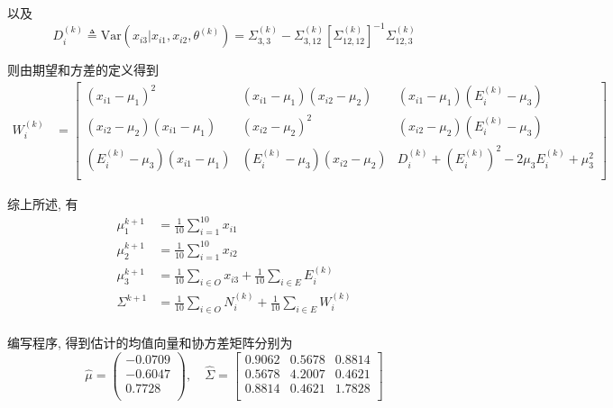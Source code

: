 \documentclass{article}
\begin{document}
以及
\begin{equation}
  D_i^{(k)}\triangleq\mathrm{Var}(x_{i3}|x_{i1},x_{i2},\theta^{(k)})=\Sigma_{3,3}^{(k)}-\Sigma_{3,12}^{(k)}\left[\Sigma_{12,12}^{(k)}\right]^{-1}\Sigma_{12,3}^{(k)}
\end{equation}

则由期望和方差的定义得到
\begin{equation}
  \begin{aligned}
    W_i^{(k)}
    &=
    \begin{bmatrix}
      (x_{i1}-\mu_1)^2 & (x_{i1}-\mu_1)(x_{i2}-\mu_2) & (x_{i1}-\mu_1)\left(E_i^{(k)}-\mu_3\right)\\[2mm]
      (x_{i2}-\mu_2)(x_{i1}-\mu_1) & (x_{i2}-\mu_2)^2 & (x_{i2}-\mu_2)\left(E_i^{(k)}-\mu_3\right)\\
      \left(E_i^{(k)}-\mu_3\right)(x_{i1}-\mu_1) & \left(E_i^{(k)}-\mu_3\right)(x_{i2}-\mu_2) & D_i^{(k)}+\left(E_i^{(k)}\right)^2-2\mu_3E_i^{(k)}+\mu_3^2\\
    \end{bmatrix}
  \end{aligned}
\end{equation}

综上所述, 有
\begin{equation}
  \begin{aligned}
    \mu_1^{k+1}&=\frac{1}{10}\sum_{i=1}^{10}x_{i1}\\
    \mu_2^{k+1}&=\frac{1}{10}\sum_{i=1}^{10}x_{i2}\\
    \mu_3^{k+1}&=\frac{1}{10}\sum_{i\in O}x_{i3}+\frac{1}{10}\sum_{i\in E}E_i^{(k)}\\
    \Sigma^{k+1}&=\frac{1}{10}\sum_{i\in O}N_i^{(k)}+\frac{1}{10}\sum_{i\in E}W_i^{(k)}\\
  \end{aligned}
\end{equation}

编写程序, 得到估计的均值向量和协方差矩阵分别为
\begin{equation}
  \hat{\mu}=
  \begin{pmatrix}
    -0.0709\\
    -0.6047\\
    0.7728\\
  \end{pmatrix},
  \quad
  \hat{\Sigma}=
  \begin{bmatrix}
    0.9062 & 0.5678 & 0.8814 \\
    0.5678 & 4.2007 & 0.4621 \\
    0.8814 & 0.4621 & 1.7828 \\
  \end{bmatrix}
\end{equation}
\end{document}
